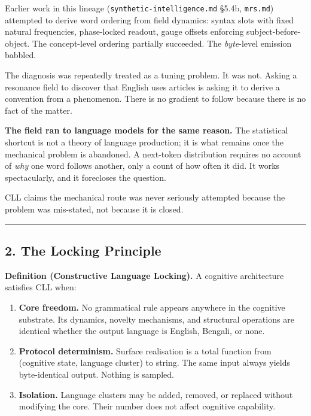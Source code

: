 \documentclass[
  11pt,
  a4paper,
]{article}
\providecommand{\tightlist}{%
  \setlength{\itemsep}{0pt}\setlength{\parskip}{0pt}}
\begin{document}
Earlier work in this lineage (\texttt{synthetic-intelligence.md} §5.4b,
\texttt{mrs.md}) attempted to derive word ordering from field dynamics:
syntax slots with fixed natural frequencies, phase-locked readout, gauge
offsets enforcing subject-before-object. The concept-level ordering
partially succeeded. The \emph{byte}-level emission babbled.

The diagnosis was repeatedly treated as a tuning problem. It was not.
Asking a resonance field to discover that English uses articles is
asking it to derive a convention from a phenomenon. There is no gradient
to follow because there is no fact of the matter.

\textbf{The field ran to language models for the same reason.} The
statistical shortcut is not a theory of language production; it is what
remains once the mechanical problem is abandoned. A next-token
distribution requires no account of \emph{why} one word follows another,
only a count of how often it did. It works spectacularly, and it
forecloses the question.

CLL claims the mechanical route was never seriously attempted because
the problem was mis-stated, not because it is closed.

\begin{center}\rule{0.5\linewidth}{0.5pt}\end{center}

\subsection{2. The Locking Principle}\label{the-locking-principle}

\textbf{Definition (Constructive Language Locking).} A cognitive
architecture satisfies CLL when:

\begin{enumerate}
\def\labelenumi{\arabic{enumi}.}
\tightlist
\item
  \textbf{Core freedom.} No grammatical rule appears anywhere in the
  cognitive substrate. Its dynamics, novelty mechanisms, and structural
  operations are identical whether the output language is English,
  Bengali, or none.
\item
  \textbf{Protocol determinism.} Surface realisation is a total function
  from (cognitive state, language cluster) to string. The same input
  always yields byte-identical output. Nothing is sampled.
\item
  \textbf{Isolation.} Language clusters may be added, removed, or
  replaced without modifying the core. Their number does not affect
  cognitive capability.
\end{enumerate}
\end{document}
